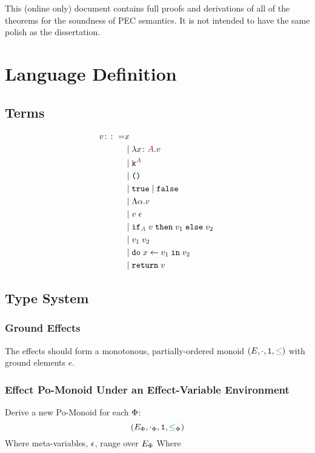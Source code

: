 \documentclass{report}
\begin{document}
\abstract

This (online only) document contains full proofs and derivations of all of the theorems for the soundness of PEC semantics. It is not intended to have the same polish as the dissertation.

\tableofcontents

\chapter{Language Definition}

\section{Terms}

\begin{align*}
        v \gens & x \\
        & \mid \lam{x}{A}{v} \\
        & \mid \const{A} \\
        & \mid \u \\
        & \mid \t \mid \f \\
        & \mid \elam{\a}{v} \\
        & \mid \eapp{v}{\e} \\
        & \mid \pifthenelse{A}{v}{v_1}{v_2} \\
        & \mid \apply{v_1}{v_2} \\
        & \mid \doin{x}{v_1}{v_2} \\
        & \mid \return{v}
\end{align*}



\section{Type System}
\subsection{Ground Effects}
The effects should form a monotonous, partially-ordered monoid $(E, \dot, \1, \subeffect)$ with ground elements $e$.

\subsection{Effect Po-Monoid Under an Effect-Variable Environment}

Derive a new Po-Monoid for each $\P$:
\begin{equation}
    (E_\P, \dotp, \1, \subeffectp)
\end{equation}
Where meta-variables, $\e$, range over $E_\P$
Where
\end{document}
